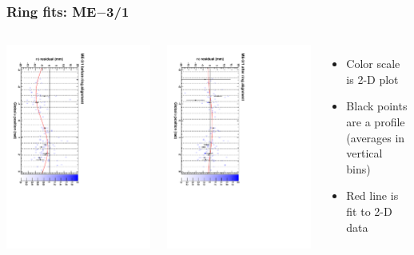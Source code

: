 \documentclass[compress]{beamer}
\begin{document}
\begin{frame}
\frametitle{Ring fits: ME$-$3/1}
\vfill
\begin{columns}
\includegraphics[height=\linewidth, angle=90]{ringfits_before/mem31.pdf}

\includegraphics[height=\linewidth, angle=90]{ringfits_after/mem31.pdf}
\begin{itemize}
\item Color scale is 2-D plot
\item Black points are a profile (averages in vertical bins)
\item Red line is fit to 2-D data
\end{itemize}
\end{columns}
\end{frame}
\end{document}
